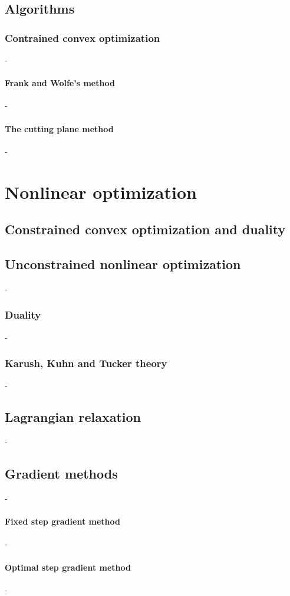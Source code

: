 \documentclass[12pt,openany,oneside]{book}
\theoremstyle{definition}
\numberwithin{exercise}{section}
\numberwithin{definition}{section}
\numberwithin{theorem}{section}
\numberwithin{corollary}{section}
\numberwithin{proposition}{section}
\numberwithin{notation}{section}
\numberwithin{remark}{section}
\numberwithin{hypothesis}{section}
\numberwithin{example}{section}
\begin{document}
\section{Algorithms}
\subsection{Contrained convex optimization}-
\subsubsection{Frank and Wolfe's method}-
\subsubsection{The cutting plane method}-

\chapter{Nonlinear optimization}
\section{Constrained convex optimization and duality}

\section{Unconstrained nonlinear optimization}-
\subsection{Duality}-
\subsection{Karush, Kuhn and Tucker theory}-
\section{Lagrangian relaxation}-
\section{Gradient methods}-
\subsubsection{Fixed step gradient method}-
\subsubsection{Optimal step gradient method}-
\end{document}
